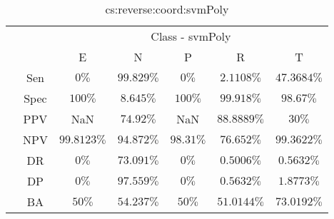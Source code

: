 \begin{table}[!ht]
	\centering
	\begin{tabular}{|c|c|c|c|c|c|c|}
		\cline{3-7}
		\multicolumn{2}{c|}{} & \multicolumn{5}{c|}{Class - svmPoly} \\ \cline{3-7}
		\multicolumn{2}{c|}{} & E & N & P & R & T \\ \hline
		\multirow{7}{*}{\rotatebox{90}{Statistics}} & Sen & $0\%$ & $99.829\%$ & $0\%$ & $2.1108\%$ & $47.3684\%$ \\ \cline{2-7}
		 & Spec & $100\%$ & $8.645\%$ & $100\%$ & $99.918\%$ & $98.67\%$ \\ \cline{2-7}
		 & PPV & NaN & $74.92\%$ & NaN & $88.8889\%$ & $30\%$ \\ \cline{2-7}
		 & NPV & $99.8123\%$ & $94.872\%$ & $98.31\%$ & $76.652\%$ & $99.3622\%$ \\ \cline{2-7}
		 & DR & $0\%$ & $73.091\%$ & $0\%$ & $0.5006\%$ & $0.5632\%$ \\ \cline{2-7}
		 & DP & $0\%$ & $97.559\%$ & $0\%$ & $0.5632\%$ & $1.8773\%$ \\ \cline{2-7}
		 & BA & $50\%$ & $54.237\%$ & $50\%$ & $51.0144\%$ & $73.0192\%$ \\ \hline
	\end{tabular}
	\caption{cs:reverse:coord:svmPoly}
	\label{tab:cs:reverse:coord:svmPoly}
\end{table}
